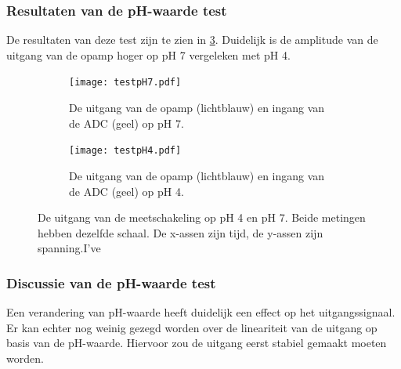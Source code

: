 \subsubsection{Resultaten van de pH-waarde test}
De resultaten van deze test zijn te zien in \cref{fig:resultspHMeasure}. Duidelijk is de amplitude van de uitgang van de opamp hoger op pH 7 vergeleken met pH 4.

\begin{figure}[!htb]
    \centering
    \begin{subfigure}[b]{0.49\textwidth}
        \centering
        \texttt{[image: testpH7.pdf]}
        \caption{De uitgang van de opamp (lichtblauw) en ingang van de ADC (geel) op pH 7.}
        \label{fig:resultpH7}
    \end{subfigure}
    \hfill
    \begin{subfigure}[b]{0.49\textwidth}
        \centering
        \texttt{[image: testpH4.pdf]}
        \caption{De uitgang van de opamp (lichtblauw) en ingang van de ADC (geel) op pH 4.}
        \label{fig:resultpH4}
    \end{subfigure}
    \caption{De uitgang van de meetschakeling op pH 4 en pH 7. Beide metingen hebben dezelfde schaal. De x-assen zijn tijd, de y-assen zijn spanning.I've }
    \label{fig:resultspHMeasure}
\end{figure}

\subsubsection{Discussie van de pH-waarde test}
Een verandering van pH-waarde heeft duidelijk een effect op het uitgangssignaal. Er kan echter nog weinig gezegd worden over de lineariteit van de uitgang op basis van de pH-waarde. Hiervoor zou de uitgang eerst stabiel gemaakt moeten worden.




